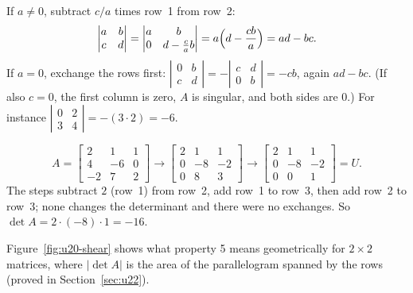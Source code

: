 \begin{example}\label{ex:u20-2by2}
If $a\neq 0$, subtract $c/a$ times row~1 from row~2:
\[
  \begin{vmatrix}a&b\\c&d\end{vmatrix}=\begin{vmatrix}a&b\\0&d-\frac{c}{a}b\end{vmatrix}
  =a\Bigl(d-\frac{cb}{a}\Bigr)=ad-bc .
\]
If $a=0$, exchange the rows first:
$\left|\begin{smallmatrix}0&b\\c&d\end{smallmatrix}\right|=-\left|\begin{smallmatrix}c&d\\0&b\end{smallmatrix}\right|=-cb$,
again $ad-bc$. (If also $c=0$, the first column is zero, $A$ is singular, and both sides are
$0$.) For instance $\left|\begin{smallmatrix}0&2\\3&4\end{smallmatrix}\right|=-(3\cdot 2)=-6$.
\end{example}

\begin{example}\label{ex:u20-3by3}
\[
  A=\begin{bmatrix}2&1&1\\4&-6&0\\-2&7&2\end{bmatrix}
  \longrightarrow
  \begin{bmatrix}2&1&1\\0&-8&-2\\0&8&3\end{bmatrix}
  \longrightarrow
  \begin{bmatrix}2&1&1\\0&-8&-2\\0&0&1\end{bmatrix}=U .
\]
The steps subtract $2$ (row~1) from row~2, add row~1 to row~3, then add row~2 to row~3; none
changes the determinant and there were no exchanges. So
$\det A=2\cdot(-8)\cdot 1=-16$.
\end{example}

Figure~\ref{fig:u20-shear} shows what property 5 means geometrically for $2\times 2$
matrices, where $|\det A|$ is the area of the parallelogram spanned by the rows (proved in
Section~\ref{sec:u22}).

